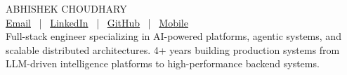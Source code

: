 \documentclass[10pt]{article}
\begin{document}
\begin{center}
	{\fontsize{\sizeone}{\sizeone} ABHISHEK CHOUDHARY}
	\\
	\vspace{2mm}
	{\fontsize{1em}{1em}
\href{mailto:choudharyabhishek2199@gmail.com}{Email} ~|~
\href{https://linkedin.com/in/av1choudharyy}{LinkedIn} ~|~
\href{https://github.com/av1choudharyy}{GitHub} ~|~
\href{tel:+918294817554}{Mobile}
}
	\\
	\vspace{2mm}
	{\fontsize{0.95em}{1.2em}
	Full-stack engineer specializing in AI-powered platforms, agentic systems, and scalable distributed architectures. 4+ years building production systems from LLM-driven intelligence platforms to high-performance backend systems.
	}
\end{center}

\vspace{-6mm}
\end{document}
